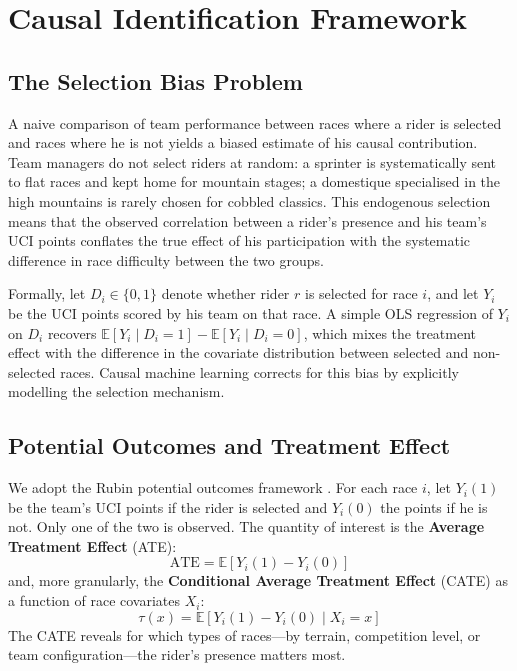 \section{Causal Identification Framework}

\subsection{The Selection Bias Problem}

A naive comparison of team performance between races where a rider is selected and races where he is not yields a biased estimate of his causal contribution. Team managers do not select riders at random: a sprinter is systematically sent to flat races and kept home for mountain stages; a domestique specialised in the high mountains is rarely chosen for cobbled classics. This endogenous selection means that the observed correlation between a rider's presence and his team's UCI points conflates the true effect of his participation with the systematic difference in race difficulty between the two groups.

Formally, let $D_i \in \{0, 1\}$ denote whether rider $r$ is selected for race $i$, and let $Y_i$ be the UCI points scored by his team on that race. A simple OLS regression of $Y_i$ on $D_i$ recovers $\mathbb{E}[Y_i \mid D_i = 1] - \mathbb{E}[Y_i \mid D_i = 0]$, which mixes the treatment effect with the difference in the covariate distribution between selected and non-selected races. Causal machine learning corrects for this bias by explicitly modelling the selection mechanism.

\subsection{Potential Outcomes and Treatment Effect}

We adopt the Rubin potential outcomes framework \citep{rubin1974}. For each race $i$, let $Y_i(1)$ be the team's UCI points if the rider is selected and $Y_i(0)$ the points if he is not. Only one of the two is observed. The quantity of interest is the \textbf{Average Treatment Effect} (ATE):
\begin{equation}
    \text{ATE} = \mathbb{E}[Y_i(1) - Y_i(0)]
    \label{eq:ate}
\end{equation}
and, more granularly, the \textbf{Conditional Average Treatment Effect} (CATE) as a function of race covariates $X_i$:
\begin{equation}
    \tau(x) = \mathbb{E}[Y_i(1) - Y_i(0) \mid X_i = x]
    \label{eq:cate}
\end{equation}
The CATE reveals for which types of races---by terrain, competition level, or team configuration---the rider's presence matters most.

